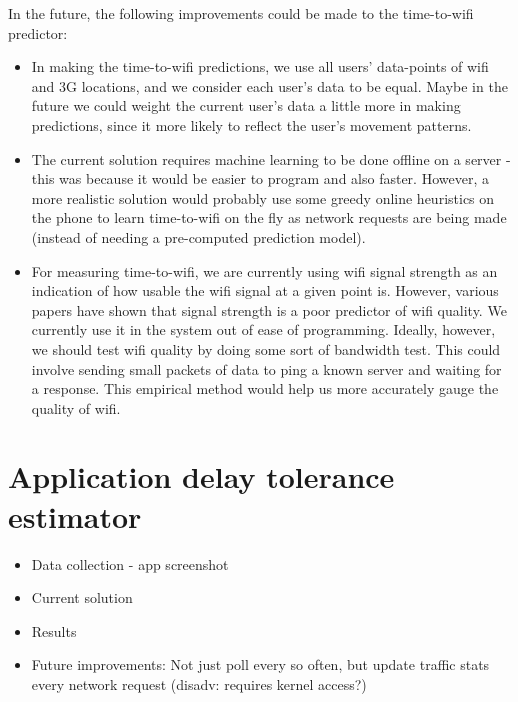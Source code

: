 \documentclass[12pt, fleqn]{article}
\begin{document}
In the future, the following improvements could be made to the time-to-wifi 
predictor:
\begin{itemize}
  \item In making the time-to-wifi predictions, we use all users' 
  data-points of wifi and 3G locations, and we consider 
  each user's data to be equal. Maybe in the future we could weight the 
  current user's data a little more in making predictions, since it more likely 
  to reflect the user's movement patterns.

  \item The current solution requires machine learning to be done offline on a 
  server - this was because it would be easier to program and also faster. 
  However, a more realistic solution would probably use some greedy online heuristics on 
  the phone to learn time-to-wifi on the fly as network requests are being 
  made (instead of needing a pre-computed prediction model).
  
  \item For measuring time-to-wifi, we are currently using wifi signal strength 
  as an indication of how usable the wifi signal at a given point is. However, 
  various papers have shown that signal strength is a poor predictor of wifi 
  quality. We currently use it in the system out of ease of programming. 
  Ideally, however, we should test wifi quality by doing some sort of bandwidth 
  test. This could involve sending small packets of data to ping a known server 
  and waiting for a response. This empirical method would help us more 
  accurately gauge the quality of wifi.
\end{itemize}


\section{Application delay tolerance estimator}
\begin{itemize}
\item Data collection - app screenshot
\item Current solution
\item Results
\item Future improvements: Not just poll every so often, but update traffic stats 
every network request (disadv: requires kernel access?)
\end{itemize}
\end{document}
